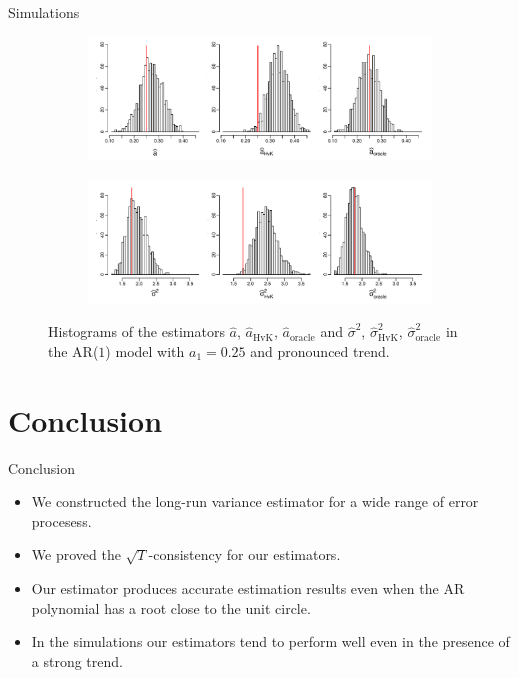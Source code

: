 \documentclass[10pt, handout]{beamer}
\begin{document}
\begin{frame}{Simulations}


\begin{figure}[t!]
\centering
\begin{subfigure}[b]{0.8\textwidth}
\includegraphics[width=\textwidth]{a_hat_histograms_a1=25_T=500_slope=10_(q,r,M1,M2)=(25,10,20,30).pdf}
\end{subfigure}
\begin{subfigure}[b]{0.8\textwidth}
\includegraphics[width=\textwidth]{lrv_histograms_a1=25_T=500_slope=10_(q,r,M1,M2)=(25,10,20,30).pdf}
\end{subfigure}
\caption{Histograms of the estimators $\widehat{a}$, $\widehat{a}_{\text{HvK}}$, $\widehat{a}_{\text{oracle}}$ and $\widehat{\sigma}^2$, $\widehat{\sigma}^2_{\text{HvK}}$, $\widehat{\sigma}^2_{\text{oracle}}$ in the AR($1$) model with $a_1 = 0.25$ and pronounced trend.}\label{fig:hist_scenario2} 
\end{figure}

\end{frame}


\section{Conclusion}
\begin{frame}{Conclusion}
\begin{itemize}
\item We constructed the long-run variance estimator for a wide range of error procesess.
\item We proved the $\sqrt{T}$-consistency for our estimators.
\item Our estimator produces accurate estimation results even when the AR polynomial has a root close to the unit circle.
\item In the simulations our estimators tend to perform well even in the presence of a strong trend.
\end{itemize}
\end{frame}
\end{document}
